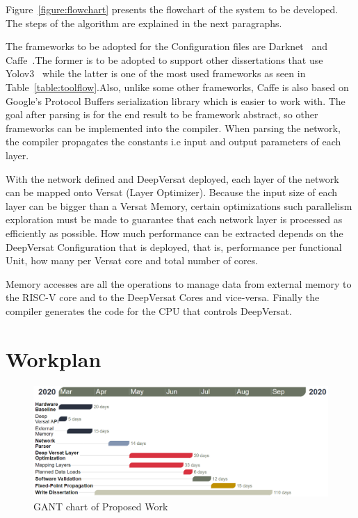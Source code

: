 Figure~\ref{figure:flowchart} presents the flowchart of the system to be developed. The steps
of the algorithm are explained in the next paragraphs.


The frameworks to be adopted for the Configuration files are Darknet~\cite{Darknet} and Caffe~\cite{caffe}.The former is to be adopted
to support other dissertations that use Yolov3~\cite{yolov3} while the latter is one of the most used frameworks as seen in Table~\ref{table:toolflow}.Also,
unlike some other frameworks, Caffe is also based on Google's Protocol Buffers serialization library which is easier to work with.
The goal after parsing is for the end result to be framework abstract, so other frameworks can be implemented into the compiler.
When parsing the network, the compiler propagates the constants i.e input and output parameters of each layer.

With the network defined and DeepVersat deployed, each layer of the network can be mapped onto Versat (Layer Optimizer). Because the input size of each layer
can be bigger than a Versat Memory, certain optimizations such parallelism exploration must be made to guarantee that each network layer is processed as efficiently as possible. 
How much performance can be extracted depends on the DeepVersat Configuration that is deployed, that is, performance per functional Unit, how many per Versat core and
total number of cores.

Memory accesses are all the operations to manage data from external memory to the RISC-V core and to the DeepVersat Cores and vice-versa.
Finally the compiler generates the code for the CPU that controls DeepVersat.
\newpage
\section{Workplan}


\begin{figure}[!htb]
    \centering
    \includegraphics[width=1\textwidth]{Figures/gant22.png}
    \caption{GANT chart of Proposed Work}
    \label{figure:gant}
\end{figure}

